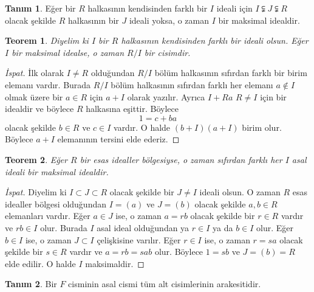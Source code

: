 \documentclass{article}
\newtheorem{thm}{Teorem}[section]
\theoremstyle{definition}
\newtheorem{defn}{Tanım}[section]
\theoremstyle{remark}
\begin{document}
    		\begin{defn}
    		    Eğer bir $R$ halkasının kendisinden farklı bir $I$ ideali için $I \subsetneqq J \subsetneqq R$ olacak şekilde $R$ halkasının bir $J$ ideali yoksa, o zaman $I$ bir maksimal idealdir.
    		\end{defn}
    		
    		\begin{thm}
    		    Diyelim ki $I$ bir $R$ halkasının kendisinden farklı bir ideali olsun. Eğer $I$ bir maksimal idealse, o zaman $R/I$ bir cisimdir.
		    \end{thm}
		    
		    \begin{proof}[İspat]
		        İlk olarak $I \neq R$ olduğundan $R/I$ bölüm halkasının sıfırdan farklı bir birim elemanı vardır. Burada $R/I$ bölüm halkasının sıfırdan farklı her elemanı $a \notin I$ olmak üzere bir $a \in R$ için $a + I$ olarak yazılır. Ayrıca $I + Ra$ $R \neq I$ için bir idealdir ve böylece $R$ halkasına eşittir. Böylece
		        \begin{equation*}
		            1 = c + ba
		        \end{equation*}
		        olacak şekilde $b \in R$ ve $c \in I$ vardır. O halde $(b + I)(a + I)$ birim olur. Böylece $a + I$ elemanının tersini elde ederiz.
		    \end{proof}
    		
    		\begin{thm}
    		    Eğer $R$ bir esas idealler bölgesiyse, o zaman sıfırdan farklı her $I$ asal ideali bir maksimal idealdir.
		    \end{thm}
		    
		    \begin{proof}[İspat]
		        Diyelim ki $I \subset J \subset R$ olacak şekilde bir $J \neq I$ ideali olsun. O zaman $R$ esas idealler bölgesi olduğundan $I = (a)$ ve $J = (b)$ olacak şekilde $a, b \in R$ elemanları vardır. Eğer $a \in J$ ise, o zaman $a = rb$ olacak şekilde bir $r \in R$ vardır ve $rb \in I$ olur. Burada $I$ asal ideal olduğundan ya $r \in I$ ya da $b \in I$ olur. Eğer $b \in I$ ise, o zaman $J \subset I$ çelişkisine varılır. Eğer $r \in I$ ise, o zaman $r = sa$ olacak şekilde bir $s \in R$ vardır ve $a = rb = sab$ olur. Böylece $1 = sb$ ve $J = (b) = R$ elde edilir. O halde $I$ maksimaldir.
		    \end{proof}
    		
    		\begin{defn}
    		    Bir $F$ cisminin asal cismi tüm alt cisimlerinin arakesitidir.
    		\end{defn}
    		
\end{document}
